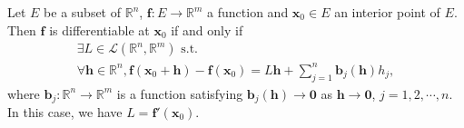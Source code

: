 \begin{thm}
  \label{thm:equivDefOfDifferentiability}
  Let $E$ be a subset of $\mathbb{R}^{n}$,
  $\mathbf{f}:E\rightarrow \mathbb{R}^{m}$ a function 
  and $\mathbf{x}_{0}\in E$ an interior point of $E$.
  Then $\mathbf{f}$ is differentiable at $\mathbf{x}_{0}$
  if and only if
  \begin{equation}
    \label{eq:equivDefOfDifferentiability}
    \begin{array}{l}
      \exists L\in \mathcal{L}(\mathbb{R}^{n},\mathbb{R}^{m})
      \text{ s.t. }\\
      \forall \mathbf{h}\in \mathbb{R}^{n},
      \mathbf{f}(\mathbf{x}_{0}+\mathbf{h})-\mathbf{f}(\mathbf{x}_{0})
      =L\mathbf{h}
      +\sum_{j=1}^{n}\mathbf{b}_{j}(\mathbf{h})h_{j},
    \end{array}
  \end{equation}
  where $\mathbf{b}_{j}: \mathbb{R}^{n}\rightarrow \mathbb{R}^{m}$
  is a function satisfying
  $\mathbf{b}_{j}(\mathbf{h})\rightarrow \mathbf{0}$ as
  $\mathbf{h}\rightarrow \mathbf{0}$, $j=1,2,\cdots,n$.
  In this case, we have $L=\mathbf{f}'(\mathbf{x}_{0})$.
\end{thm}
